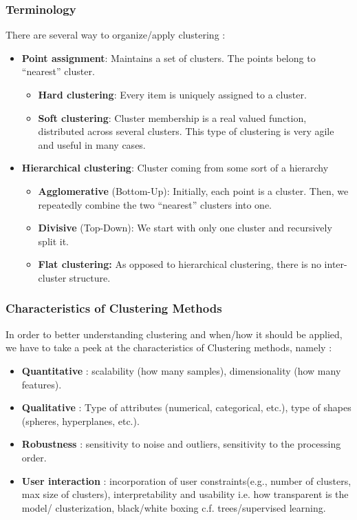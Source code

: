 \subsubsection{Terminology}
There are several way to organize/apply clustering :
\begin{itemize}
  \item \textbf{Point assignment}: Maintains a set of clusters. The points belong to ``nearest'' cluster.
  \begin{itemize}
   \item \textbf{Hard clustering}: Every item is uniquely assigned to a cluster.
   \item \textbf{Soft clustering}: Cluster membership is a real valued function, distributed across several clusters. This type of clustering is very agile and useful in many cases.
  \end{itemize}
  \item \textbf{Hierarchical clustering}: Cluster coming from some sort of a hierarchy
  \begin{itemize}
   \item \textbf{Agglomerative} (Bottom-Up): Initially, each point is a cluster. Then, we repeatedly combine the two ``nearest'' clusters into one.
   \item \textbf{Divisive} (Top-Down): We start with only one cluster and recursively split it.
   \item \textbf{Flat clustering: } As opposed to hierarchical clustering, there is no inter-cluster structure.
  \end{itemize} 
\end{itemize}

\subsubsection{Characteristics of Clustering Methods}

In order to better understanding clustering and when/how it should be applied, we have to take a peek at the characteristics of Clustering methods, namely :
\begin{itemize}
	\item \textbf{Quantitative} : scalability (how many samples), dimensionality (how many features).
	\item \textbf{Qualitative} : Type of attributes (numerical, categorical, etc.), type of shapes (spheres, hyperplanes, etc.).
	\item \textbf{Robustness} : sensitivity to noise and outliers, sensitivity to the processing order.
	\item \textbf{User interaction} : incorporation of user constraints(e.g., number of clusters, max size of clusters), interpretability and usability i.e. how transparent is the model/ clusterization, black/white boxing c.f. trees/supervised learning.
\end{itemize}

